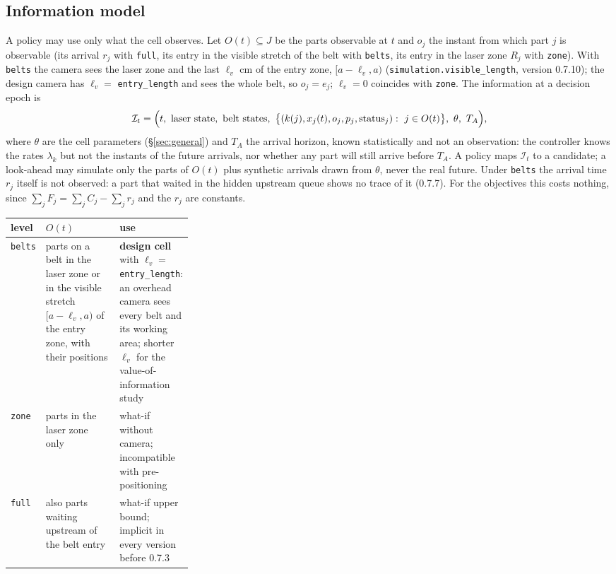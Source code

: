 \documentclass[11pt,a4paper]{article}
\theoremstyle{definition}
\theoremstyle{remark}
\begin{document}
\subsection{Information model}\label{sec:info}
A policy may use only what the cell observes. Let $O(t)\subseteq J$ be the parts
observable at $t$ and $o_j$ the instant from which part $j$ is observable (its arrival
$r_j$ with \texttt{full}, its entry in the visible stretch of the belt with
\texttt{belts}, its entry in the laser zone $R_j$ with \texttt{zone}). With
\texttt{belts} the camera sees the laser zone and the last $\ell_v$ cm of the entry
zone, $[a-\ell_v,a)$ (\texttt{simulation.visible\_length}, version 0.7.10); the design
camera has $\ell_v=$ \texttt{entry\_length} and sees the whole belt, so $o_j=e_j$;
$\ell_v=0$ coincides with \texttt{zone}. The information at a decision epoch is
\[
\mathcal I_t=\Bigl(t,\ \text{laser state},\ \text{belt states},\
\bigl\{(k(j),x_j(t),o_j,p_j,\text{status}_j):\ j\in O(t)\bigr\},\ \theta,\ T_A\Bigr),
\]
where $\theta$ are the cell parameters (\S\ref{sec:general}) and $T_A$ the arrival
horizon, known statistically and not an observation: the controller knows the rates
$\lambda_k$ but not the instants of the future arrivals, nor whether any part will still
arrive before $T_A$. A policy maps $\mathcal I_t$ to a candidate; a look-ahead may
simulate only the parts of $O(t)$ plus synthetic arrivals drawn from $\theta$, never the
real future. Under \texttt{belts} the arrival time $r_j$ itself is not observed: a part
that waited in the hidden upstream queue shows no trace of it (0.7.7). For the
objectives this costs nothing, since $\sum_j F_j=\sum_j C_j-\sum_j r_j$ and the $r_j$
are constants.

\begin{center}
\begin{tabularx}{\linewidth}{@{}l >{\raggedright\arraybackslash}X >{\raggedright\arraybackslash}p{0.3\linewidth}@{}}
\toprule
level & $O(t)$ & use\\
\midrule
\texttt{belts} & parts on a belt in the laser zone or in the visible stretch $[a-\ell_v,a)$ of the entry zone, with their positions & \textbf{design cell} with $\ell_v=$ \texttt{entry\_length}: an overhead camera sees every belt and its working area; shorter $\ell_v$ for the value-of-information study\\
\texttt{zone} & parts in the laser zone only & what-if without camera; incompatible with pre-positioning\\
\texttt{full} & also parts waiting upstream of the belt entry & what-if upper bound; implicit in every version before 0.7.3\\
\bottomrule
\end{tabularx}
\end{center}
\end{document}
